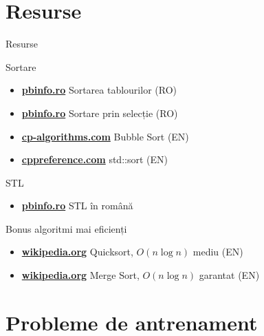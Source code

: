 \documentclass{beamer}
\begin{document}
\section{Resurse}

\begin{frame}{Resurse}
  \begin{block}{Sortare}
    \begin{itemize}
      \item \href{https://www.pbinfo.ro/articole/5587/sortarea-tablourilor}{\textbf{pbinfo.ro}} \textemdash{} Sortarea tablourilor (RO)
      \item \href{https://www.pbinfo.ro/articole/5563/sortarea-prin-selectie}{\textbf{pbinfo.ro}} \textemdash{} Sortare prin selecție (RO)
      \item \href{https://cp-algorithms.com/sequences/bubble-sort.html}{\textbf{cp-algorithms.com}} \textemdash{} Bubble Sort (EN)
      \item \href{https://en.cppreference.com/w/cpp/algorithm/sort}{\textbf{cppreference.com}} \textemdash{} std::sort (EN)
    \end{itemize}
  \end{block}
  \begin{block}{STL}
    \begin{itemize}
      \item \href{https://www.pbinfo.ro/articole/23702/standard-template-library-stl}{\textbf{pbinfo.ro}} \textemdash{} STL în română
    \end{itemize}
  \end{block}
  \begin{block}{Bonus \textemdash{} algoritmi mai eficienți}
    \begin{itemize}
      \item \href{https://en.wikipedia.org/wiki/Quicksort}{\textbf{wikipedia.org}} \textemdash{} Quicksort, $O(n \log n)$ mediu (EN)
      \item \href{https://en.wikipedia.org/wiki/Merge_sort}{\textbf{wikipedia.org}} \textemdash{} Merge Sort, $O(n \log n)$ garantat (EN)
    \end{itemize}
  \end{block}
\end{frame}

\section{Probleme de antrenament}
\end{document}
